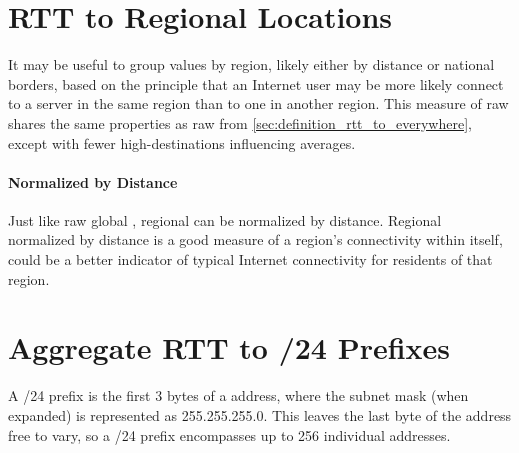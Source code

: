 % 

\section{RTT to Regional Locations}\label{sec:definition_rtt_regional}

It may be useful to group \rtt values by region, likely either by distance or national borders, based on the principle that an Internet user may be more likely connect to a server in the same region than to one in another region. This measure of raw \rtt shares the same properties as raw \rtt from \cref{sec:definition_rtt_to_everywhere}, except with fewer high-\rtt destinations influencing averages.

\paragraph{Normalized by Distance}
Just like raw global \rtts, regional \rtts can be normalized by distance. Regional \rtt normalized by distance is a good measure of a region's connectivity within itself, could be a better indicator of typical Internet connectivity for residents of that region.

\section{Aggregate RTT to /24 Prefixes}\label{sec:definition_rtt_24}

A /24 prefix is the first 3 bytes of a \ipvf address, where the subnet mask (when expanded) is represented as 255.255.255.0. This leaves the last byte of the address free to vary, so a /24 prefix encompasses up to 256 individual addresses.

